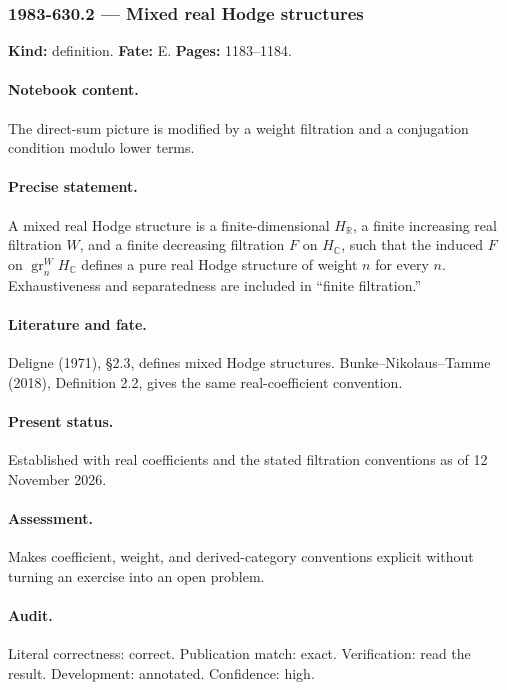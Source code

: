 \subsubsection{1983-630.2 --- Mixed real Hodge structures}

\label{item:1983-630.2}

\noindent\textbf{Kind:} definition. \textbf{Fate:} E. \textbf{Pages:} 1183--1184.\par

\paragraph{Notebook content.} The direct-sum picture is modified by a weight filtration and a conjugation condition modulo lower terms.

\paragraph{Precise statement.} A mixed real Hodge structure is a finite-dimensional \(H_{\mathbb R}\), a finite increasing real filtration \(W\), and a finite decreasing filtration \(F\) on \(H_{\mathbb C}\), such that the induced \(F\) on \(\operatorname{gr}^W_nH_{\mathbb C}\) defines a pure real Hodge structure of weight \(n\) for every \(n\). Exhaustiveness and separatedness are included in “finite filtration.”

\paragraph{Literature and fate.} Deligne (1971), \S2.3, defines mixed Hodge structures. Bunke–Nikolaus–Tamme (2018), Definition 2.2, gives the same real-coefficient convention.

\paragraph{Present status.} Established with real coefficients and the stated filtration conventions as of 12 November 2026.

\paragraph{Assessment.} Makes coefficient, weight, and derived-category conventions explicit without turning an exercise into an open problem.

\paragraph{Audit.} Literal correctness: correct. Publication match: exact. Verification: read the result. Development: annotated. Confidence: high.

